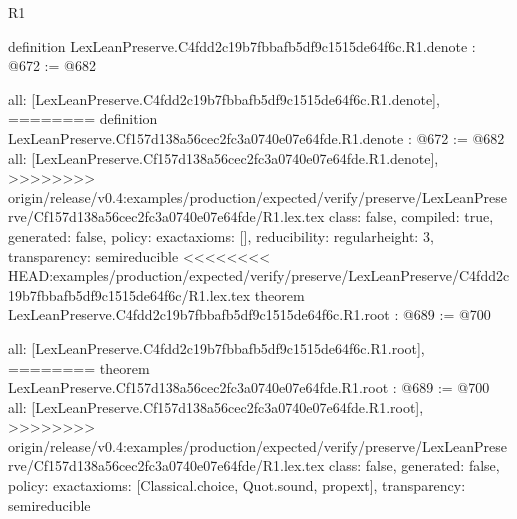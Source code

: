 \begin{lexlean}{R1}
\begin{coremodule}
{{{{{{definition LexLeanPreserve.C4fdd2c19b7fbbafb5df9c1515de64f6c.R1.denote : @672 := @682 {
  all: [LexLeanPreserve.C4fdd2c19b7fbbafb5df9c1515de64f6c.R1.denote],
========
definition LexLeanPreserve.Cf157d138a56cec2fc3a0740e07e64fde.R1.denote : @672 := @682 {
  all: [LexLeanPreserve.Cf157d138a56cec2fc3a0740e07e64fde.R1.denote],
>>>>>>>> origin/release/v0.4:examples/production/expected/verify/preserve/LexLeanPreserve/Cf157d138a56cec2fc3a0740e07e64fde/R1.lex.tex
  class: false,
  compiled: true,
  generated: false,
  policy: exact{axioms: []},
  reducibility: regular{height: 3},
  transparency: semireducible
}
<<<<<<<< HEAD:examples/production/expected/verify/preserve/LexLeanPreserve/C4fdd2c19b7fbbafb5df9c1515de64f6c/R1.lex.tex
theorem LexLeanPreserve.C4fdd2c19b7fbbafb5df9c1515de64f6c.R1.root : @689 := @700 {
  all: [LexLeanPreserve.C4fdd2c19b7fbbafb5df9c1515de64f6c.R1.root],
========
theorem LexLeanPreserve.Cf157d138a56cec2fc3a0740e07e64fde.R1.root : @689 := @700 {
  all: [LexLeanPreserve.Cf157d138a56cec2fc3a0740e07e64fde.R1.root],
>>>>>>>> origin/release/v0.4:examples/production/expected/verify/preserve/LexLeanPreserve/Cf157d138a56cec2fc3a0740e07e64fde/R1.lex.tex
  class: false,
  generated: false,
  policy: exact{axioms: [Classical.choice, Quot.sound, propext]},
  transparency: semireducible
}

}}}}}}}}
\end{coremodule}
\end{lexlean}
